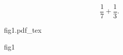 \documentclass[12pt,a4paper]{scrartcl}
\newcommand{\incfig}[1]{%
    \def\svgwidth{\columnwidth}
    {#1.pdf_tex}
}
\begin{document}
\[
\frac{1}{7}+\frac{1}{3}
.\]

\begin{figure}[ht]
    \centering
    \incfig{fig1}
    \caption{fig1}
    \label{fig:fig1}
\end{figure}
\end{document}
